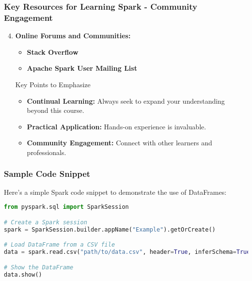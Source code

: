 \documentclass[aspectratio=169]{beamer}
\begin{document}
\begin{frame}[fragile]
    \frametitle{Key Resources for Learning Spark - Community Engagement}
    \begin{enumerate}
        \setcounter{enumi}{3}
        \item \textbf{Online Forums and Communities:}
        \begin{itemize}
            \item \textbf{Stack Overflow}
            \item \textbf{Apache Spark User Mailing List}
        \end{itemize}
        
        \begin{block}{Key Points to Emphasize}
            \begin{itemize}
                \item \textbf{Continual Learning:} Always seek to expand your understanding beyond this course.
                \item \textbf{Practical Application:} Hands-on experience is invaluable.
                \item \textbf{Community Engagement:} Connect with other learners and professionals.
            \end{itemize}
        \end{block}
    \end{enumerate}
\end{frame}

\begin{frame}[fragile]
    \frametitle{Sample Code Snippet}
    Here’s a simple Spark code snippet to demonstrate the use of DataFrames:
    \begin{lstlisting}[language=Python]
from pyspark.sql import SparkSession

# Create a Spark session
spark = SparkSession.builder.appName("Example").getOrCreate()

# Load DataFrame from a CSV file
data = spark.read.csv("path/to/data.csv", header=True, inferSchema=True)

# Show the DataFrame
data.show()
    \end{lstlisting}
\end{frame}
\end{document}
